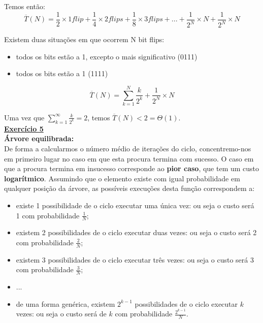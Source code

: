 \documentclass[a4paper,11pt]{article}
\begin{document}
	\noindent Temos então:
	\[
		\overline{T}(N) = \frac{1}{2} \times 1 flip + \frac{1}{4} \times 2 flips + \frac{1}{8} \times 3 flips + ... + \frac{1}{2^N} \times N + \frac{1}{2^N} \times N
	\]
	
	\noindent Existem duas situações em que ocorrem N bit flips:
	
	\begin{itemize}
		\item todos os bits estão a 1, excepto o mais significativo (0111)
		\item todos os bits estão a 1 (1111)
	\end{itemize}
	\[
		\overline{T}(N) = \sum_{k=1}^{N} \frac{k}{2^k} + \frac{1}{2^N} \times N
	\]
	
	\noindent Uma vez que $ \sum_{k=1}^{\infty} \frac{k}{2^k} = 2 $, temos $ \overline{T}(N) < 2 = \Theta(1) $.\\
	
	
	\noindent \underline{\textbf{Exercício 5}}\\
	
	\noindent \textbf{Árvore equilibrada:}\\
	
	\noindent De forma a calcularmos o número médio de iterações do ciclo, concentremo-nos em primeiro lugar no caso em que esta procura termina com sucesso. O caso em que a procura termina em insucesso corresponde ao \textbf{pior caso}, que tem um custo \textbf{logarítmico}. Assumindo que o elemento existe com igual probabilidade em qualquer posição da árvore, as possíveis execuções desta função correspondem a:
	
	\begin{itemize}
		\item existe 1 possibilidade de o ciclo executar uma única vez: ou seja o custo será 1 com probabilidade $\frac{1}{N}$;
		\item existem 2 possibilidades de o ciclo executar duas vezes: ou seja o custo será 2 com probabilidade $\frac{2}{N}$;
		\item existem 3 possibilidades de o ciclo executar três vezes: ou seja o custo será 3 com probabilidade $\frac{3}{N}$;
		\item ...
		\item de uma forma genérica, existem $2^{k-1}$ possibilidades de o ciclo executar $k$ vezes: ou seja o custo será de $k$ com probabilidade $\frac{2^{k-1}}{N}$.
	\end{itemize}
	
\end{document}
